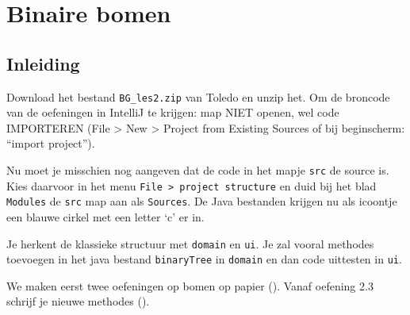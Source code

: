 \chapter{Binaire bomen}

\section*{Inleiding}

Download het bestand \verb=BG_les2.zip= van Toledo en unzip het. Om de broncode van de oefeningen in IntelliJ te krijgen: map NIET openen, wel code IMPORTEREN (File > New > Project from Existing Sources of bij beginscherm: “import project”). 

Nu moet je misschien nog aangeven dat de code in het mapje \verb+src+ de source is. Kies daarvoor in het menu \verb+File > project structure+ en duid bij het blad \verb+Modules+ de \verb+src+ map aan als \verb+Sources+. De Java bestanden krijgen nu als icoontje een blauwe cirkel met een letter ‘c’ er in.

Je herkent de klassieke structuur met \verb+domain+ en \verb+ui+. Je zal vooral methodes toevoegen in het java bestand \verb=binaryTree= in \verb+domain+ en dan code uittesten in \verb+ui+.



We maken eerst twee oefeningen op bomen op papier (\papier). Vanaf oefening 2.3 schrijf je nieuwe methodes (\code).

